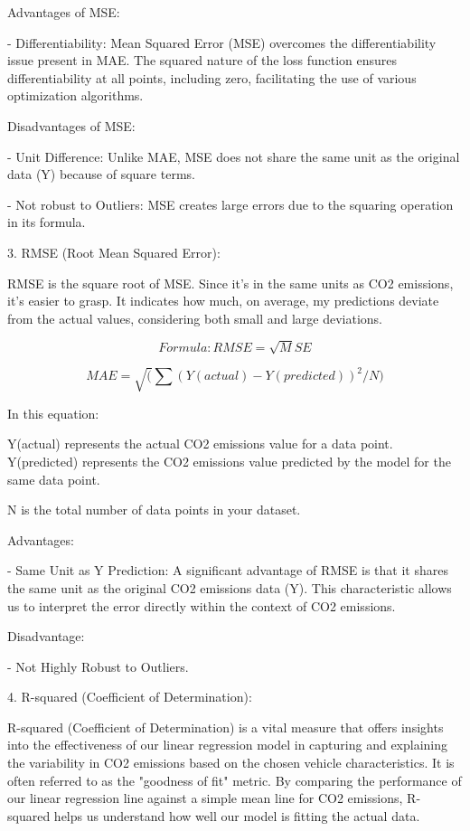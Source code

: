 \documentclass[12pt, a4paper,oneside]{book}
\numberwithin{equation}{section}
\begin{document}
Advantages of MSE:

- Differentiability: Mean Squared Error (MSE) overcomes the differentiability issue present in MAE. The squared nature of the loss function ensures differentiability at all points, including zero, facilitating the use of various optimization algorithms.

Disadvantages of MSE:

- Unit Difference: Unlike MAE, MSE does not share the same unit as the original data (Y) because of square terms.

- Not robust to Outliers: MSE creates large errors due to the squaring operation in its formula. 

\hfill \break


3. RMSE (Root Mean Squared Error): 

RMSE is the square root of MSE. Since it's in the same units as CO2 emissions, it's easier to grasp. It indicates how much, on average, my predictions deviate from the actual values, considering both small and large deviations.


\begin{equation}
       Formula: RMSE = \sqrt MSE
\end{equation}

\begin{equation}
    MAE =\sqrt (\sum (Y(actual) - Y(predicted))^2 / N)
\end{equation}

In this equation:

Y(actual) represents the actual CO2 emissions value for a data point.
Y(predicted) represents the CO2 emissions value predicted by the model for the same data point.

N is the total number of data points in your dataset.

Advantages:

- Same Unit as Y Prediction: A significant advantage of RMSE is that it shares the same unit as the original CO2 emissions data (Y). This characteristic allows us to interpret the error directly within the context of CO2 emissions.

Disadvantage:

- Not Highly Robust to Outliers.


\newpage


4. R-squared (Coefficient of Determination): 


R-squared (Coefficient of Determination) is a vital measure that offers insights into the effectiveness of our linear regression model in capturing and explaining the variability in CO2 emissions based on the chosen vehicle characteristics. It is often referred to as the "goodness of fit" metric. By comparing the performance of our linear regression line against a simple mean line for CO2 emissions, R-squared helps us understand how well our model is fitting the actual data.
\end{document}
